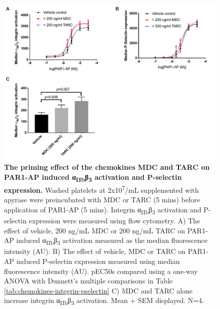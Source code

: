 \documentclass[11pt,twoside]{bristolthesis}
\begin{document}
\begin{figure}

{\centering \includegraphics[width=0.8\linewidth]{figure/Chemokines/Layouts/P-selectin_integrin_MDC_TARC} 

}

\caption[The priming effect of the chemokines MDC and TARC on PAR1-AP induced α\textsubscript{IIb}β\textsubscript{3} activation and P-selectin expression]{\textbf{The priming effect of the chemokines MDC and TARC on PAR1-AP induced α\textsubscript{IIb}β\textsubscript{3} activation and P-selectin expression.} Washed platelets at 2x10\textsuperscript{7}/mL supplemented with apyrase were preincubated with MDC or TARC (5 mins) before application of PAR1-AP (5 mins). Integrin α\textsubscript{IIb}β\textsubscript{3} activation and P-selectin expression were measured using flow cytometry. A) The effect of vehicle, 200 ng/mL MDC or 200 ng/mL TARC on PAR1-AP induced α\textsubscript{IIb}β\textsubscript{3} activation measured as the median fluorescence intensity (AU). B) The effect of vehicle, MDC or TARC on PAR1-AP induced P-selectin expression measured using median fluorescence intensity (AU). pEC50s compared using a one-way ANOVA with Dunnett's multiple comparisons in Table \ref{tab:chemokines-integrin-pselectin} C) MDC and TARC alone increase integrin α\textsubscript{IIb}β\textsubscript{3} activation. Mean + SEM displayed. N=4.}\label{fig:MDC-TARC-integrin-pselectin}
\end{figure}
\end{document}
